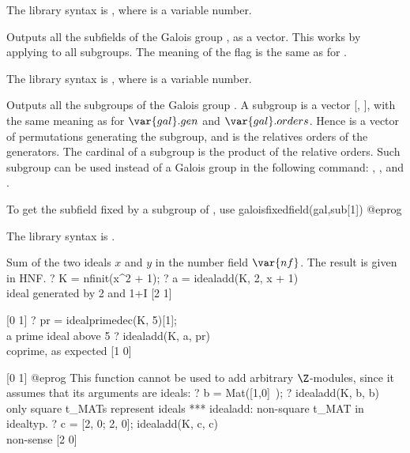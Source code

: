 The library syntax is , where  is a variable number.

\label{se:galoissubfields}
Outputs all the subfields of the Galois group , as a vector.
This works by applying  to all subgroups. The meaning of
the flag  is the same as for .

The library syntax is , where  is a variable number.

\label{se:galoissubgroups}
Outputs all the subgroups of the Galois group . A subgroup is a
vector [, ], with the same meaning
as for $\var{gal}.gen$ and $\var{gal}.orders$. Hence  is a vector of
permutations generating the subgroup, and  is the relatives
orders of the generators. The cardinal of a subgroup is the product of the
relative orders. Such subgroup can be used instead of a Galois group in the
following command: , ,
 and .

To get the subfield fixed by a subgroup  of , use
\bprog
galoisfixedfield(gal,sub[1])
@eprog

The library syntax is .

\label{se:idealadd}
Sum of the two ideals $x$ and $y$ in the number field $\var{nf}$. The
result is given in HNF.
\bprog
 ? K = nfinit(x^2 + 1);
 ? a = idealadd(K, 2, x + 1)  \\ ideal generated by 2 and 1+I
 [2 1]

 [0 1]
 ? pr = idealprimedec(K, 5)[1];  \\ a prime ideal above 5
 ? idealadd(K, a, pr)     \\ coprime, as expected
 [1 0]

 [0 1]
@eprog\noindent
This function cannot be used to add arbitrary $\Z$-modules, since it assumes
that its arguments are ideals:
\bprog
  ? b = Mat([1,0]~);
  ? idealadd(K, b, b)     \\ only square t_MATs represent ideals
  *** idealadd: non-square t_MAT in idealtyp.
  ? c = [2, 0; 2, 0]; idealadd(K, c, c)   \\ non-sense
  [2 0]

